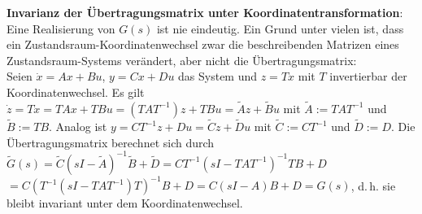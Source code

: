 \textbf{Invarianz der Übertragungsmatrix unter Koordinatentransformation}:\\
Eine Realisierung von $G(s)$ ist nie eindeutig.
Ein Grund unter vielen ist, dass ein Zustandsraum-Koordinatenwechsel zwar die
beschreibenden Matrizen eines Zustandsraum-Systems verändert, aber nicht die Übertragungsmatrix:\\
Seien $\dot{x} = Ax + Bu$, $y = Cx + Du$ das System und $z = Tx$ mit $T$ invertierbar
der Koordinatenwechsel.
Es gilt $\dot{z} = T\dot{x} = TAx + TBu = (TAT^{-1})z + TBu = \widetilde{A}z + \widetilde{B}u$
mit $\widetilde{A} := TAT^{-1}$ und $\widetilde{B} := TB$.
Analog ist $y = CT^{-1}z + Du = \widetilde{C}z + \widetilde{D}u$
mit $\widetilde{C} := CT^{-1}$ und $\widetilde{D} := D$.
Die Übertragungsmatrix berechnet sich durch
$\widetilde{G}(s)
= \widetilde{C} (sI - \widetilde{A})^{-1} \widetilde{B} + \widetilde{D}
= CT^{-1} (sI - TAT^{-1})^{-1} TB + D$\\
$= C (T^{-1} (sI - TAT^{-1}) T)^{-1} B + D
= C (sI - A) B + D
= G(s)$, d.\,h. sie bleibt invariant unter dem Koordinatenwechsel.

\pagebreak
